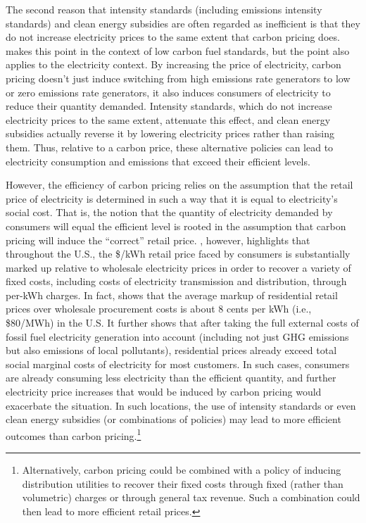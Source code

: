 \documentclass[12pt]{article}
\begin{document}
The second reason that intensity standards (including emissions intensity standards) and clean energy subsidies are often regarded as inefficient is that they do not increase electricity prices to the same extent that carbon pricing does. \cite{holland2009greenhouse} makes this point in the context of low carbon fuel standards, but the point also applies to the electricity context. By increasing the price of electricity, carbon pricing doesn't just induce switching from high emissions rate generators to low or zero emissions rate generators, it also induces consumers of electricity to reduce their quantity demanded. Intensity standards, which do not increase electricity prices to the same extent, attenuate this effect, and clean energy subsidies actually reverse it by lowering electricity prices rather than raising them. Thus, relative to a carbon price, these alternative policies can lead to electricity consumption and emissions that exceed their efficient levels.

However, the efficiency of carbon pricing relies on the assumption that the retail price of electricity is determined in such a way that it is equal to electricity's social cost. That is, the notion that the quantity of electricity demanded by consumers will equal the efficient level is rooted in the assumption that carbon pricing will induce the ``correct'' retail price. \cite{borenstein2022dotwo}, however, highlights that throughout the U.S., the \$/kWh retail price faced by consumers is substantially marked up relative to wholesale electricity prices in order to recover a variety of fixed costs, including costs of electricity transmission and distribution, through per-kWh charges. In fact, \cite{borenstein2022dotwo} shows that the average markup of residential retail prices over wholesale procurement costs is about 8 cents per kWh (i.e., \$80/MWh) in the U.S. It further shows that after taking the full external costs of fossil fuel electricity generation into account (including not just GHG emissions but also emissions of local pollutants), residential prices already exceed total social marginal costs of electricity for most customers. In such cases, consumers are already consuming less electricity than the efficient quantity, and further electricity price increases that would be induced by carbon pricing would exacerbate the situation. In such locations, the use of intensity standards or even clean energy subsidies (or combinations of policies) may lead to more efficient outcomes than carbon pricing.\footnote{Alternatively, carbon pricing could be combined with a policy of inducing distribution utilities to recover their fixed costs through fixed (rather than volumetric) charges or through general tax revenue. Such a combination could then lead to more efficient retail prices.} 
\end{document}
